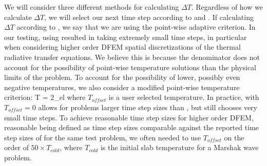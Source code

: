 We will consider three different methods for calculating $\Delta T$.  
Regardless of how we calculate $\Delta T$, we will select our next time step according to  and .
If calculating $\Delta T$ according to , we say that we are using the point-wise adaptive criterion.
In our testing, using  resulted in taking extremely small time steps, in particular when considering higher order DFEM spatial discretizations of the thermal radiative transfer equations.
We believe this is because the denominator does not account for the possibility of point-wise temperature solutions than the physical limits of the problem.
To account for the possibility of lower, possibly even negative temperatures, we also consider a modified point-wise temperature criterion:
\benum
\Delta T = 2\max_{el}  \pec
\label{eq:modified_pointwise_adaptive}
\eenum
where $T_{offset}$ is a user selected temperature.  
In practice,  with $T_{offset} = 0$ allows for problems larger time step sizes than , but still chooses very small time steps.
To achieve reasonable time step sizes for higher order DFEM, reasonable being defined as time step sizes comparable against the reported time step sizes of \cite{time_adaptive_diffusion} for the same test problem, we often needed to use $T_{offset}$ on the order of $50\times T_{cold}$, where $T_{cold}$ is the initial slab temperature for a Marshak wave problem.

